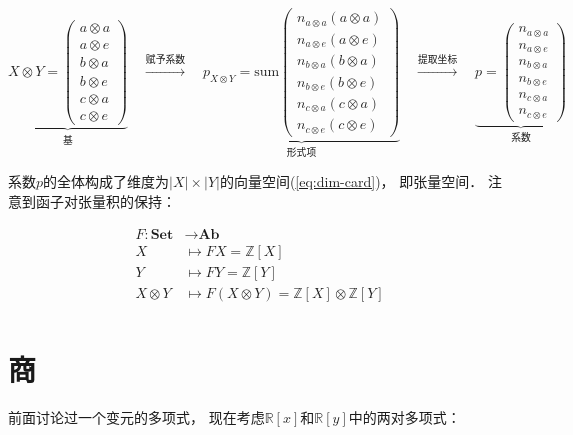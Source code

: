 \documentclass[10pt, openany]{book}
\begin{document}
\begin{equation}
\underbrace{X \otimes Y=\begin{pmatrix}a \otimes a \\ a \otimes e \\ b \otimes a \\ b \otimes e \\ c \otimes a \\ c \otimes e\end{pmatrix}}_{\text{基}}
\quad \xrightarrow{\text{赋予系数}} \quad
\underbrace{p_{X \otimes Y}=\text{sum}\begin{pmatrix}n_{a \otimes a}(a \otimes a) \\ n_{a \otimes e}(a \otimes e) \\ n_{b \otimes a}(b \otimes a) \\ n_{b \otimes e}(b \otimes e) \\ n_{c \otimes a}(c \otimes a) \\ n_{c \otimes e}(c \otimes e)\end{pmatrix}}_{\text{形式项}}
\quad \xrightarrow{\text{提取坐标}} \quad
\underbrace{p=\begin{pmatrix}n_{a \otimes a} \\ n_{a \otimes e} \\ n_{b \otimes a} \\ n_{b \otimes e} \\ n_{c \otimes a} \\ n_{c \otimes e}\end{pmatrix}}_{\text{系数}}
\end{equation}

系数$p$的全体构成了维度为$|X| \times |Y|$的向量空间(\ref{eq:dim-card})，
即张量空间．
注意到函子对张量积的保持：

$$
\begin{aligned}
F: \textbf{Set} &\to \textbf{Ab} \\
X &\mapsto FX = \mathbb Z[X] \\
Y &\mapsto FY = \mathbb Z[Y] \\
X \otimes Y &\mapsto F(X \otimes Y) = \mathbb Z[X] \otimes \mathbb Z[Y] \\
\end{aligned}
$$

\section{商}

前面讨论过一个变元的多项式，
现在考虑$\mathbb R[x]$和$\mathbb R[y]$中的两对多项式：
\end{document}
